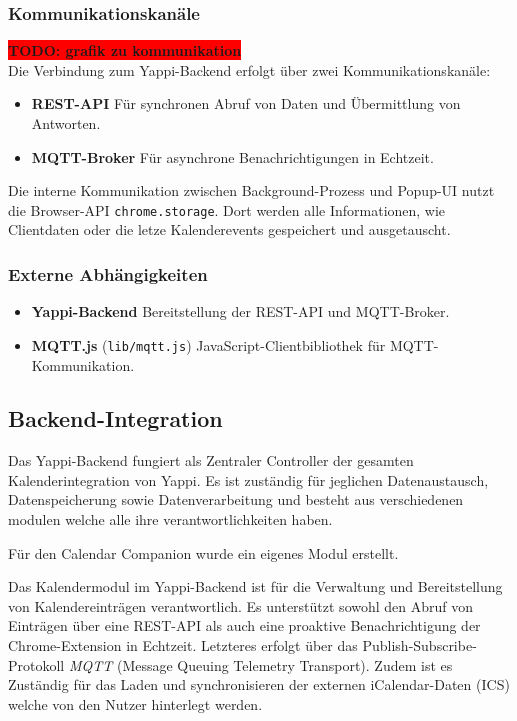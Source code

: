 \documentclass[12pt,a4paper]{report}
\newcommand{\todo}[1]{\colorbox{red}{\textbf{TODO: #1}}\\}
\begin{document}
    \subsubsection{Kommunikationskanäle}
      \todo{grafik zu kommunikation}
        Die Verbindung zum Yappi-Backend erfolgt über zwei Kommunikationskanäle:
        \begin{itemize}
          \item \textbf{REST-API} Für synchronen Abruf von Daten und Übermittlung von Antworten.
          \item \textbf{MQTT-Broker} Für asynchrone Benachrichtigungen in Echtzeit.
        \end{itemize}

        Die interne Kommunikation zwischen Background-Prozess und Popup-UI nutzt die Browser-API \texttt{chrome.storage}.
        Dort werden alle Informationen, wie Clientdaten oder die letze Kalenderevents gespeichert und ausgetauscht.



    \subsubsection{Externe Abhängigkeiten}
        \begin{itemize}
          \item \textbf{Yappi-Backend} Bereitstellung der REST-API und MQTT-Broker.
          \item \textbf{MQTT.js} (\texttt{lib/mqtt.js}) JavaScript-Clientbibliothek für MQTT-Kommunikation.
        \end{itemize}

\subsection{Backend-Integration}

        Das Yappi-Backend fungiert als Zentraler Controller der gesamten Kalenderintegration von Yappi.
        Es ist zuständig für jeglichen Datenaustausch, Datenspeicherung sowie Datenverarbeitung und besteht
        aus verschiedenen modulen welche alle ihre verantwortlichkeiten haben.

        Für den Calendar Companion wurde ein eigenes Modul erstellt.

        Das Kalendermodul im Yappi-Backend ist für die Verwaltung und Bereitstellung von Kalendereinträgen verantwortlich.
        Es unterstützt sowohl den Abruf von Einträgen über eine REST-API als auch eine proaktive Benachrichtigung der Chrome-Extension in Echtzeit.
        Letzteres erfolgt über das Publish-Subscribe-Protokoll \textit{MQTT} (Message Queuing Telemetry Transport).
        Zudem ist es Zuständig für das Laden und synchronisieren der externen iCalendar-Daten (ICS) welche von den Nutzer hinterlegt werden.
\end{document}
